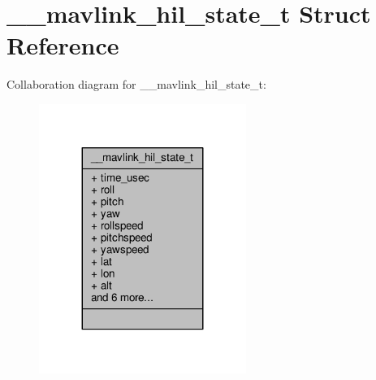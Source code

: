 \hypertarget{struct____mavlink__hil__state__t}{\section{\+\_\+\+\_\+mavlink\+\_\+hil\+\_\+state\+\_\+t Struct Reference}
\label{struct____mavlink__hil__state__t}
}


Collaboration diagram for \+\_\+\+\_\+mavlink\+\_\+hil\+\_\+state\+\_\+t\+:
\nopagebreak
\begin{figure}[H]
\begin{center}
\leavevmode
\includegraphics[width=191pt]{struct____mavlink__hil__state__t__coll__graph}
\end{center}
\end{figure}
